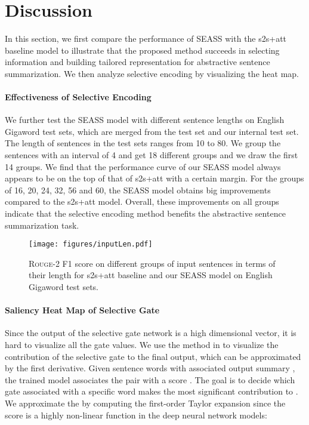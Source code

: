 \documentclass[11pt,a4paper]{article}
\newcommand{\ourModelName}{SEASS}
\begin{document}
\section{Discussion}
\label{sec:disc}


In this section, we first compare the performance of \ourModelName{} with the s2s+att baseline model to illustrate that the proposed method succeeds in selecting information and building tailored representation for abstractive sentence summarization.
We then analyze selective encoding by visualizing the heat map.



\paragraph{Effectiveness of Selective Encoding}
We further test the \ourModelName{} model with different sentence lengths on English Gigaword test sets, which are merged from the \citet{rush-chopra-weston:2015:EMNLP} test set and our internal test set.
The length of sentences in the test sets ranges from 10 to 80.
We group the sentences with an interval of 4 and get 18 different groups and we draw the first 14 groups.
We find that the performance curve of our \ourModelName{} model always appears to be on the top of that of s2s+att with a certain margin.
For the groups of 16, 20, 24, 32, 56 and 60, the \ourModelName{} model obtains big improvements compared to the s2s+att model.
Overall, these improvements on all groups indicate that the selective encoding method benefits the abstractive sentence summarization task.

\begin{figure}[htbp]
	\centering
	\texttt{[image: figures/inputLen.pdf]}
	\caption{\label{fig:gigaRougeLen} \textsc{Rouge}-2 F1 score on different groups of input sentences in terms of their length for s2s+att baseline and our \ourModelName{} model on English Gigaword test sets.}
\end{figure}



\paragraph{Saliency Heat Map of Selective Gate}
Since the output of the selective gate network is a high dimensional vector, it is hard to visualize all the gate values.
We use the method in \citet{jiweiliNaacl} to visualize the contribution of the selective gate to the final output, which can be approximated by the first derivative.
Given sentence words  with associated output summary , the trained model associates the pair  with a score .
The goal is to decide which gate  associated with a specific word makes the most significant contribution to .
We approximate the  by computing the first-order Taylor expansion since the score  is a highly non-linear function in the deep neural network models:
\end{document}
